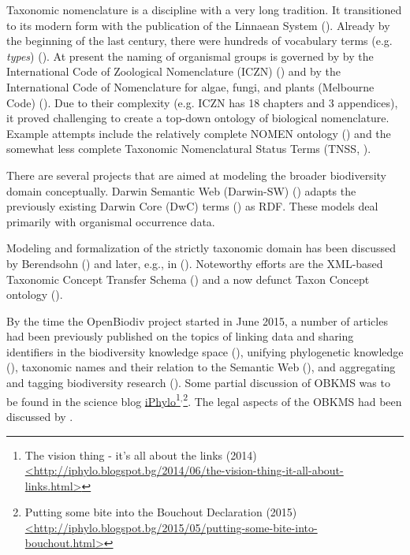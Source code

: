 {Taxonomic nomenclature is a discipline with a very long tradition. It transitioned to its modern form with the publication of the Linnaean System (\cite{linnaeus_systema_1758}). Already by the beginning of the last century, there were hundreds of vocabulary terms (e.g. \emph{types}) (\cite{witteveen_naming_2015}). At present the naming of organismal groups is governed by by the International Code of Zoological Nomenclature (ICZN) (\cite{international_commission_on_zoological_nomenclature_international_1999}) and by the International Code of Nomenclature for algae, fungi, and plants (Melbourne Code) (\cite{mcneill_international_2012}). Due to their complexity (e.g. ICZN has 18 chapters and 3 appendices), it proved challenging to create a top-down ontology of biological nomenclature. Example attempts include the relatively complete NOMEN ontology (\cite{dmitriev_nomen_2017}) and the somewhat less complete Taxonomic Nomenclatural Status Terms (TNSS, \cite{morris_taxonomic_nodate}).

There are several projects that are aimed at modeling the broader biodiversity domain conceptually. Darwin Semantic Web (Darwin-SW) (\cite{baskauf_darwin-sw:_2016}) adapts the previously existing Darwin Core (DwC) terms (\cite{wieczorek_darwin_2012}) as RDF. These models deal primarily with organismal occurrence data.

Modeling and formalization of the strictly taxonomic domain has been discussed by Berendsohn (\cite{berendsohn_concept_1995}) and later, e.g., in (\cite{franz_perspectives:_2009,sterner_taxonomy_2017}). Noteworthy efforts are the XML-based Taxonomic Concept Transfer Schema (\cite{taxonomic_names_and_concepts_interest_group_taxonomic_2006}) and a now defunct Taxon Concept ontology (\cite{devries_taxon_nodate}).

By the time the OpenBiodiv project started in June 2015, a number of articles had been previously published on the topics of linking data and sharing identifiers in the biodiversity knowledge space (\cite{page_biodiversity_2008}), unifying phylogenetic knowledge (\cite{parr_evolutionary_2012}), taxonomic names and their relation to the Semantic Web (\cite{page_taxonomic_2006,patterson_names_2010}), and aggregating and tagging biodiversity research (\cite{mindell_aggregating_2011}). Some partial discussion of OBKMS was to be found in the science blog \href{http://iphylo.blogspot.bg}{iPhylo}\footnote{The vision thing - it's all about the links (2014) \href{http://iphylo.blogspot.bg/2014/06/the-vision-thing-it-all-about-links.html}{<http://iphylo.blogspot.bg/2014/06/the-vision-thing-it-all-about-links.html>}}$^{,}$\footnote{Putting some bite into the Bouchout Declaration (2015) \href{http://iphylo.blogspot.bg/2015/05/putting-some-bite-into-bouchout.html}{<http://iphylo.blogspot.bg/2015/05/putting-some-bite-into-bouchout.html>}}. The legal aspects of the OBKMS had been discussed by \cite{egloff_open_2014}.

}

